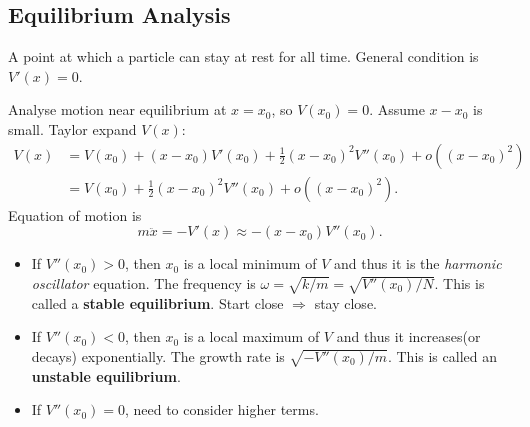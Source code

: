 \subsection{Equilibrium Analysis}
\begin{definition}
    A point at which a particle can stay at rest for all time. General condition is $ V'(x)=0 $. 
\end{definition}
Analyse motion near equilibrium at $ x=x_0 $, so $ V(x_0)=0 $. Assume $x-x_0$ is small. Taylor expand $V(x)$:
\begin{align*}
    V(x) &= V(x_0)+(x-x_0)V'(x_0)+\frac{1}{2}(x-x_0)^2V''(x_0)+o((x-x_0)^2)\\ 
    &= V(x_0)+\frac{1}{2}(x-x_0)^2V''(x_0)+o((x-x_0)^2).
\end{align*}
Equation of motion is 
\[
    m \ddot{x} = -V'(x) \approx - (x-x_0)V''(x_0).
\]

\begin{itemize}
    \item If $ V''(x_0)>0 $, then $x_0$ is a local minimum of $V$ and thus it is the \textit{harmonic oscillator} equation. The frequency is $ \omega = \sqrt{k/m} = \sqrt{V''(x_0)/N} $. This is called a \textbf{stable equilibrium}. Start close $\Rightarrow$ stay close.
    \item If $ V''(x_0)<0 $, then $x_0$ is a local maximum of $V$ and thus it increases(or decays) exponentially. The growth rate is $ \sqrt{-V''(x_0)/m} $. This is called an \textbf{unstable equilibrium}. 
    \item If $ V''(x_0)=0 $, need to consider higher terms.
\end{itemize}

